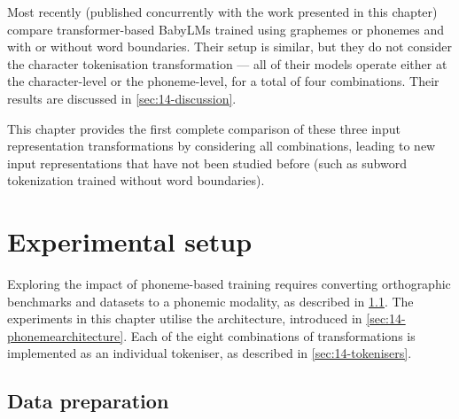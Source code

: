 Most recently (published concurrently with the work presented in this chapter) \citet{bunzeck-etal-2025-small} compare transformer-based BabyLMs trained using graphemes or phonemes and with or without word boundaries. Their setup is similar, but they do not consider the character tokenisation transformation --- all of their models operate either at the character-level or the phoneme-level, for a total of four combinations. Their results are discussed in \cref{sec:14-discussion}.

This chapter provides the first complete comparison of these three input representation transformations by considering all combinations, leading to new input representations that have not been studied before (such as subword tokenization trained without word boundaries). 



\section{Experimental setup}\label{sec:14-lmsetup}

Exploring the impact of phoneme-based training requires converting orthographic benchmarks and datasets to a phonemic modality, as described in \cref{sec:14-datapreparation}. The experiments in this chapter utilise the \gpt architecture, introduced in \cref{sec:14-phonemearchitecture}. Each of the eight combinations of transformations is implemented as an individual tokeniser, as described in \cref{sec:14-tokenisers}.

\subsection{Data preparation}\label{sec:14-datapreparation}

